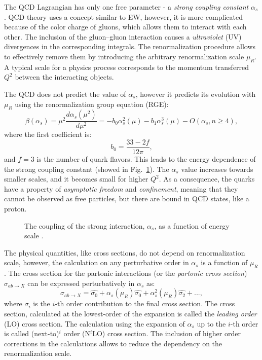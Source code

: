 The QCD Lagrangian has only one free parameter - a \textit{strong coupling constant} $\alpha_s$. QCD theory uses a concept  similar to EW, however, it is more complicated because of the color charge of gluons, which allows them to interact with each other. The inclusion of the gluon--gluon interaction causes a  \textit{ultraviolet} (UV) divergences in the corresponding integrals. The renormalization procedure\cite{Renorm} allows to effectively remove them by introducing the arbitrary renormalization scale $\mu_R$. A typical scale for a physics process corresponds to the momentum transferred $Q^2$ between the interacting objects.

The QCD does not predict the value of $\alpha_s$, however it predicts its evolution with $\mu_{R}$ using the renormalization group equation (RGE):
\begin{equation}
\beta(\alpha_s) = \mu^2 \frac{d\alpha_s(\mu^2)}{d\mu^2}= - b_0 \alpha_s^2(\mu) - b_1 \alpha_s^3(\mu)-O(\alpha_s, n\geqslant4), 
\end{equation}
where the first coefficient is:
\begin{equation}
b_0 = \frac{33-2f}{12\pi},
\end{equation}
and $f=3$ is the number of quark flavors. This leads to the energy dependence of the strong coupling constant (showed in Fig.~\ref{fig:SMAlphaS}). The $\alpha_s$ value increases towards smaller scales, and it becomes small for higher $Q^2$. As a consequence, the quarks have a property of \textit{asymptotic freedom} and \textit{confinement}, meaning that they cannot be observed as free particles, but there are bound in QCD states, like a proton.

\begin{figure}[!tbp]
\caption{The coupling  of the strong interaction, $\alpha_s$, as a function of energy scale \cite{alphaS}.}
\label{fig:SMAlphaS}
\end{figure}


The physical quantities, like cross sections, do not depend on renormalization scale, however, the calculation on any perturbative order in $\alpha_s$ is a function of $\mu_R$. The cross section for the partonic interactions (or the \textit{partonic cross section}) $\sigma_{ab\to X}$ can be expressed perturbatively in $\alpha_s$ as:
\begin{equation}
\sigma_{ab\to X}=\hat{\sigma_0}+\alpha_{s}(\mu_R)\hat{\sigma_0}+\alpha^2_{s}(\mu_R)\hat{\sigma_2}+..., 
\end{equation}
where $\sigma_i$ is the $i$-th order contribution to the final cross section. The cross section, calculated at the lowest-order of the expansion is called the \textit{leading order} (LO) cross section. The calculation using the expansion of $\alpha_s$ up to the $i$-th order is called (next-to)$^i$ order (N$^i$LO) cross section. The inclusion of higher order corrections in the calculations allows to reduce the dependency on the renormalization scale. 



